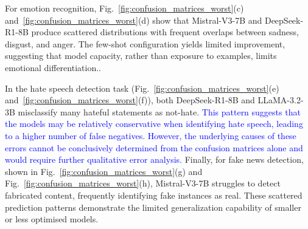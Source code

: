 \documentclass[10pt,letterpaper]{article}
\newcommand{\rev}[1]{\textcolor{blue}{#1}}
\begin{document}
For emotion recognition, Fig.~\ref{fig:confusion_matrices_worst}(c) and~\ref{fig:confusion_matrices_worst}(d) show that Mistral-V3-7B and DeepSeek-R1-8B produce scattered distributions with frequent overlaps between sadness, disgust, and anger. The few-shot configuration yields limited improvement, suggesting that model capacity, rather than exposure to examples, limits emotional differentiation..

In the hate speech detection task (Fig.~\ref{fig:confusion_matrices_worst}(e) and~\ref{fig:confusion_matrices_worst}(f)), both DeepSeek-R1-8B and LLaMA-3.2-3B misclassify many hateful statements as not-hate. \rev{This pattern suggests that the models may be relatively conservative when identifying hate speech, leading to a higher number of false negatives. However, the underlying causes of these errors cannot be conclusively determined from the confusion matrices alone and would require further qualitative error analysis.} Finally, for fake news detection, shown in Fig.~\ref{fig:confusion_matrices_worst}(g) and Fig.~\ref{fig:confusion_matrices_worst}(h), Mistral-V3-7B struggles to detect fabricated content, frequently identifying fake instances as real. These scattered prediction patterns demonstrate the limited generalization capability of smaller or less optimised models.
\end{document}
